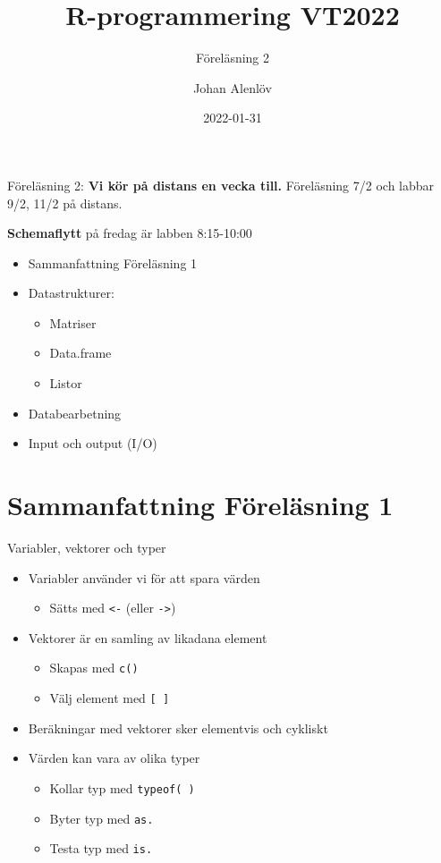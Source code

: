 \documentclass[
  11pt,
  ignorenonframetext,
]{beamer}
\title{R-programmering VT2022}
\subtitle{Föreläsning 2}
\author{Johan Alenlöv}
\date{2022-01-31}
\institute{Linköpings Universitet}
\providecommand{\tightlist}{%
  \setlength{\itemsep}{0pt}\setlength{\parskip}{0pt}}
\begin{document}
\frame{\titlepage}

\begin{frame}{Föreläsning 2:}
\protect\hypertarget{fuxf6reluxe4sning-2}{}
\textbf{Vi kör på distans en vecka till.} Föreläsning 7/2 och labbar
9/2, 11/2 på distans.

\textbf{Schemaflytt} på fredag är labben 8:15-10:00

\begin{itemize}
\tightlist
\item
  Sammanfattning Föreläsning 1
\item
  Datastrukturer:

  \begin{itemize}
  \tightlist
  \item
    Matriser
  \item
    Data.frame
  \item
    Listor
  \end{itemize}
\item
  Databearbetning
\item
  Input och output (I/O)
\end{itemize}
\end{frame}

\hypertarget{sammanfattning-fuxf6reluxe4sning-1}{%
\section{Sammanfattning Föreläsning
1}\label{sammanfattning-fuxf6reluxe4sning-1}}

\begin{frame}{Variabler, vektorer och typer}
\protect\hypertarget{variabler-vektorer-och-typer}{}
\begin{itemize}
\tightlist
\item
  Variabler använder vi för att spara värden

  \begin{itemize}
  \tightlist
  \item
    Sätts med \texttt{<-} (eller \texttt{->})
  \end{itemize}
\item
  Vektorer är en samling av likadana element

  \begin{itemize}
  \tightlist
  \item
    Skapas med \texttt{c()}
  \item
    Välj element med \texttt{[ ]}
  \end{itemize}
\item
  Beräkningar med vektorer sker elementvis och cykliskt
\item
  Värden kan vara av olika typer

  \begin{itemize}
  \tightlist
  \item
    Kollar typ med \texttt{typeof( )}
  \item
    Byter typ med \texttt{as.}
  \item
    Testa typ med \texttt{is.}
  \end{itemize}
\end{itemize}
\end{frame}
\end{document}
